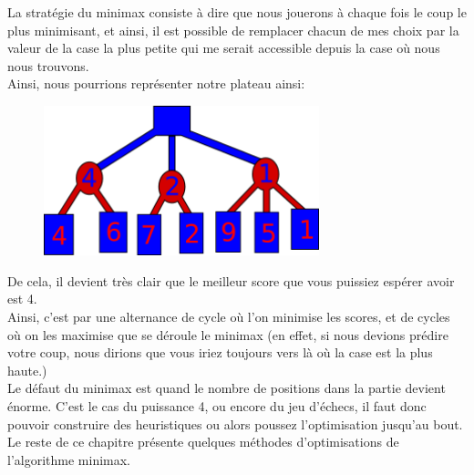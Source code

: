 \documentclass[a4paper, 12pt]{article}
\numberwithin{equation}{subsection}
\begin{document}
La stratégie du minimax consiste à dire que nous jouerons à chaque fois le coup le plus minimisant, et ainsi, il est possible de remplacer chacun de mes choix par la valeur de la case la plus petite qui me serait accessible depuis la case où nous nous trouvons.\\

Ainsi, nous pourrions représenter notre plateau ainsi:\\
\begin{figure}[H]
  \centering
  \includegraphics[width=8.0cm]{imgs/minimax.png}
\end{figure}
De cela, il devient très clair que le meilleur score que vous puissiez espérer avoir est 4.\\

Ainsi, c'est par une alternance de cycle où l'on minimise les scores, et de cycles où on les maximise que se déroule le minimax (en effet, si nous devions prédire votre coup, nous dirions que vous iriez toujours vers là où la case est la plus haute.)\\

Le défaut du minimax est quand le nombre de positions dans la partie devient énorme. C'est le cas du puissance 4, ou encore du jeu d'échecs, il faut donc pouvoir construire des heuristiques ou alors poussez l'optimisation jusqu'au bout.\\

Le reste de ce chapitre présente quelques méthodes d'optimisations de l'algorithme minimax.\\
\end{document}
